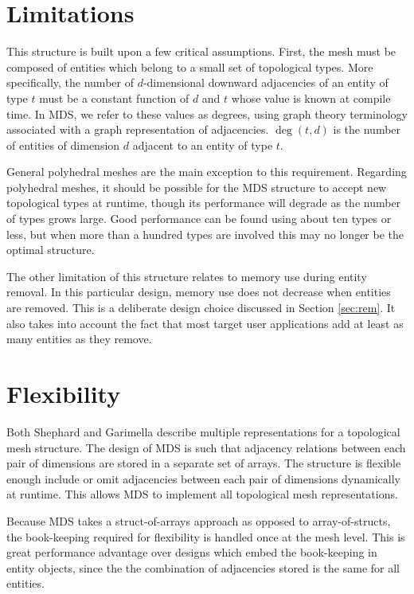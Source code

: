 \documentclass{article}
\begin{document}
\section{Limitations}

This structure is built upon a few critical assumptions.
First, the mesh must be composed of entities which belong to a small set
of topological types.
More specifically, the number of $d$-dimensional downward adjacencies
of an entity of type $t$ must be a constant function of $d$ and $t$
whose value is
known at compile time.
In MDS, we refer to these values as degrees, using graph theory terminology
associated with a graph representation of adjacencies.
$\deg(t,d)$ is the number of entities of dimension $d$ adjacent
to an entity of type $t$.

General polyhedral meshes are the main exception to this requirement.
Regarding polyhedral meshes, it should be possible for the MDS structure
to accept new topological types at runtime, though its performance
will degrade as the number of types grows large.
Good performance can be found using about ten types or less, but
when more than a hundred types are involved this may no longer
be the optimal structure.

The other limitation of this structure relates to memory use
during entity removal.
In this particular design, memory use does not decrease
when entities are removed.
This is a deliberate design choice discussed in Section \ref{sec:rem}.
It also takes into account the fact that most target user
applications add at least as many entities as they remove.

\section{Flexibility}

Both Shephard \cite{beall1995mesh} and Garimella
\cite{garimella2002mesh} describe multiple representations
for a topological mesh structure.
The design of MDS is such that adjacency relations between each
pair of dimensions are stored in a separate set of arrays.
The structure is flexible enough include or omit
adjacencies between each pair of dimensions
dynamically at runtime.
This allows MDS to implement all topological mesh representations.

Because MDS takes a struct-of-arrays approach as opposed to
array-of-structs, the book-keeping required for flexibility
is handled once at the mesh level.
This is great performance advantage over designs which
embed the book-keeping in entity objects, since the
the combination of adjacencies stored is the same for
all entities.
\end{document}
